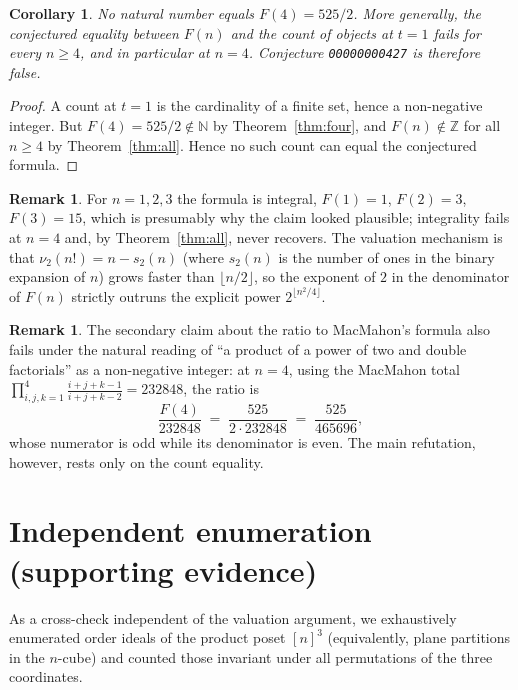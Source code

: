 \documentclass[11pt]{article}
\newtheorem{corollary}[theorem]{Corollary}
\theoremstyle{definition}
\newtheorem{remark}[theorem]{Remark}
\begin{document}
\begin{corollary}\label{cor:false}
No natural number equals $F(4)=525/2$. More generally, the conjectured
equality between $F(n)$ and the count of objects at $t=1$ fails for every
$n\ge 4$, and in particular at $n=4$. Conjecture \texttt{00000000427} is
therefore false.
\end{corollary}

\begin{proof}
A count at $t=1$ is the cardinality of a finite set, hence a non-negative
integer. But $F(4)=525/2\notin\mathbb{N}$ by Theorem~\ref{thm:four}, and
$F(n)\notin\mathbb{Z}$ for all $n\ge4$ by Theorem~\ref{thm:all}. Hence no such
count can equal the conjectured formula.
\end{proof}

\begin{remark}
For $n = 1,2,3$ the formula is integral,
$F(1)=1$, $F(2)=3$, $F(3)=15$, which is presumably why the claim looked
plausible; integrality fails at $n=4$ and, by Theorem~\ref{thm:all}, never
recovers. The valuation mechanism is that $\nu_{2}(n!) = n - s_{2}(n)$ (where
$s_{2}(n)$ is the number of ones in the binary expansion of $n$) grows faster
than $\lfloor n/2\rfloor$, so the exponent of $2$ in the denominator of $F(n)$
strictly outruns the explicit power $2^{\lfloor n^{2}/4\rfloor}$.
\end{remark}

\begin{remark}
The secondary claim about the ratio to MacMahon's formula also fails under the
natural reading of ``a product of a power of two and double factorials'' as a
non-negative integer: at $n=4$, using the MacMahon total
$\prod_{i,j,k=1}^{4}\frac{i+j+k-1}{i+j+k-2} = 232848$, the ratio is
\[
  \frac{F(4)}{232848} \;=\; \frac{525}{2\cdot 232848}
  \;=\; \frac{525}{465696},
\]
whose numerator is odd while its denominator is even. The main refutation,
however, rests only on the count equality.
\end{remark}

\section{Independent enumeration (supporting evidence)}

As a cross-check independent of the valuation argument, we exhaustively
enumerated order ideals of the product poset $[n]^{3}$ (equivalently, plane
partitions in the $n$-cube) and counted those invariant under all permutations
of the three coordinates.
\end{document}
